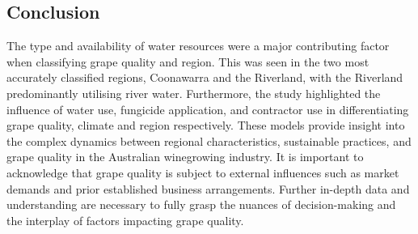 \documentclass[review,12pt,authoryear]{elsarticle}
\begin{document}
\begin{linenumbers}
\section{Conclusion}

The type and availability of water resources were a major contributing factor when classifying grape quality and region. This was seen in the two most accurately classified regions, Coonawarra and the Riverland, with the Riverland predominantly utilising river water. Furthermore, the study highlighted the influence of water use, fungicide application, and contractor use in differentiating grape quality, climate and region respectively. These models provide insight into the complex dynamics between regional characteristics, sustainable practices, and grape quality in the Australian winegrowing industry. It is important to acknowledge that grape quality is subject to external influences such as market demands and prior established business arrangements. Further in-depth data and understanding are necessary to fully grasp the nuances of decision-making and the interplay of factors impacting grape quality.




 \appendix

\end{linenumbers}
  
\end{document}

